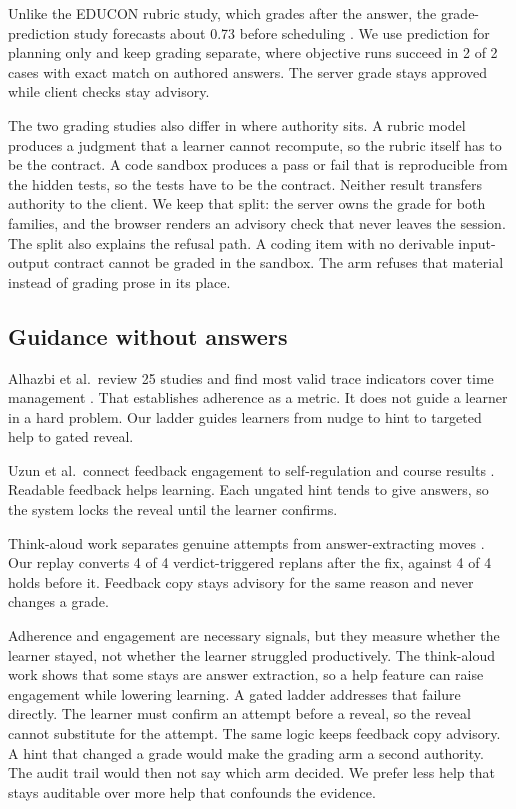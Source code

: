 \documentclass[sn-mathphys,Numbered]{sn-jnl}%
\theoremstyle{thmstyleone}%
\theoremstyle{thmstyletwo}%
\theoremstyle{thmstylethree}%
\begin{document}
Unlike the EDUCON rubric study, which grades after the answer, the grade-prediction study forecasts about 0.73 before scheduling \cite{islam2024}. We use prediction for planning only and keep grading separate, where objective runs succeed in 2 of 2 cases with exact match on authored answers. The server grade stays approved while client checks stay advisory.

The two grading studies also differ in where authority sits. A rubric model produces a judgment that a learner cannot recompute, so the rubric itself has to be the contract. A code sandbox produces a pass or fail that is reproducible from the hidden tests, so the tests have to be the contract. Neither result transfers authority to the client. We keep that split: the server owns the grade for both families, and the browser renders an advisory check that never leaves the session. The split also explains the refusal path. A coding item with no derivable input-output contract cannot be graded in the sandbox. The arm refuses that material instead of grading prose in its place.

\subsection{Guidance without answers}\label{subsec24}

Alhazbi et al.\ review 25 studies and find most valid trace indicators cover time management \cite{alhazbi2024}. That establishes adherence as a metric. It does not guide a learner in a hard problem. Our ladder guides learners from nudge to hint to targeted help to gated reveal.

Uzun et al.\ connect feedback engagement to self-regulation and course results \cite{uzun2025}. Readable feedback helps learning. Each ungated hint tends to give answers, so the system locks the reveal until the learner confirms.

Think-aloud work separates genuine attempts from answer-extracting moves \cite{gaming2026}. Our replay converts 4 of 4 verdict-triggered replans after the fix, against 4 of 4 holds before it. Feedback copy stays advisory for the same reason and never changes a grade.

Adherence and engagement are necessary signals, but they measure whether the learner stayed, not whether the learner struggled productively. The think-aloud work shows that some stays are answer extraction, so a help feature can raise engagement while lowering learning. A gated ladder addresses that failure directly. The learner must confirm an attempt before a reveal, so the reveal cannot substitute for the attempt. The same logic keeps feedback copy advisory. A hint that changed a grade would make the grading arm a second authority. The audit trail would then not say which arm decided. We prefer less help that stays auditable over more help that confounds the evidence.
\end{document}

